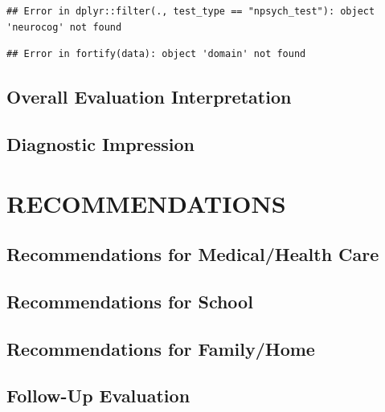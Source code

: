 \documentclass[%
numbers=noendperiod,
parskip=half,
bibliography=totoc,
DIV=calc,headsepline=true,
]{scrartcl}
\begin{document}
\begin{verbatim}
## Error in dplyr::filter(., test_type == "npsych_test"): object 'neurocog' not found
\end{verbatim}

\begin{verbatim}
## Error in fortify(data): object 'domain' not found
\end{verbatim}

\hypertarget{overall-evaluation-interpretation}{%
\subsection{Overall Evaluation Interpretation}\label{overall-evaluation-interpretation}}

\hypertarget{diagnostic-impression}{%
\subsection{Diagnostic Impression}\label{diagnostic-impression}}

\hypertarget{recommendations}{%
\section{RECOMMENDATIONS}\label{recommendations}}

\hypertarget{recommendations-for-medicalhealth-care}{%
\subsection{Recommendations for Medical/Health Care}\label{recommendations-for-medicalhealth-care}}

\hypertarget{recommendations-for-school}{%
\subsection{Recommendations for School}\label{recommendations-for-school}}

\hypertarget{recommendations-for-familyhome}{%
\subsection{Recommendations for Family/Home}\label{recommendations-for-familyhome}}

\hypertarget{follow-up-evaluation}{%
\subsection{Follow-Up Evaluation}\label{follow-up-evaluation}}
\end{document}
